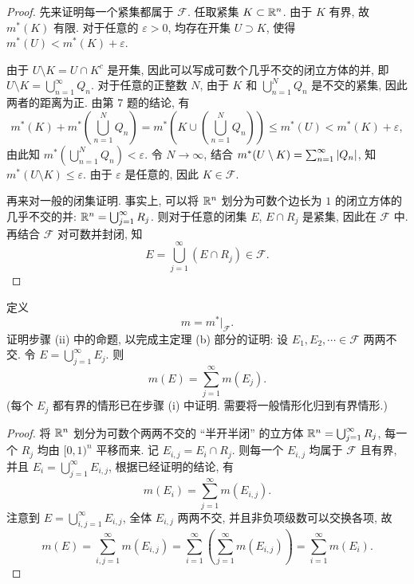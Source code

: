 \documentclass{article}
\begin{document}
\begin{proof}
	先来证明每一个紧集都属于 $\mathcal{F}$. 任取紧集 $K \subset \mathbb{R}^n$. 由于 $K$ 有界, 故 $m^*(K)$ 有限. 对于任意的 $\varepsilon>0$, 均存在开集 $U \supset K$, 使得 $m^*(U) < m^*(K) + \varepsilon$. 

	由于 $U \setminus K = U \cap K^c$ 是开集, 因此可以写成可数个几乎不交的闭立方体的并, 即 $U \setminus K = \bigcup_{n=1}^{\infty} Q_n$. 对于任意的正整数 $N$, 由于 $K$ 和 $\bigcup_{n=1}^{N} Q_n$ 是不交的紧集, 因此两者的距离为正. 由第 7 题的结论, 有
	\[ m^*(K) + m^* \left( \bigcup_{n=1}^{N} Q_n \right) = m^* \left( K \cup \left( \bigcup_{n=1}^{N} Q_n \right) \right) \le m^*(U) < m^*(K) + \varepsilon, \]
	由此知 $m^* \left( \bigcup_{n=1}^{N}Q_n \right) < \varepsilon$. 令 $N \to \infty$, 结合 $m^*(U \setminus K) = \sum_{n=1}^{\infty} \left|Q_n\right|$, 知 $m^*(U \setminus K) \le \varepsilon$. 由于 $\varepsilon$ 是任意的, 因此 $K \in \mathcal{F}$.

	再来对一般的闭集证明. 事实上, 可以将 $\mathbb{R}^n$ 划分为可数个边长为 $1$ 的闭立方体的几乎不交的并: $\mathbb{R}^n = \bigcup_{j = 1}^{\infty}R_j$. 则对于任意的闭集 $E$, $E \cap R_j$ 是紧集, 因此在 $\mathcal{F}$ 中. 再结合 $\mathcal{F}$ 对可数并封闭, 知
	\[ E = \bigcup_{j=1}^{\infty} (E \cap R_j) \in \mathcal{F}. \]
\end{proof}



\begin{problem}
  定义
  \[
    m=m^*|_{\mathcal{F}}.
  \]
  证明步骤 (ii) 中的命题, 以完成主定理 (b) 部分的证明: 设 $E_1,E_2,\cdots\in\mathcal{F}$ 两两不交. 令 $E=\bigcup_{j=1}^\infty E_j$. 则
  \[
    m(E)=\sum_{j=1}^\infty m(E_j).
  \]
  (每个 $E_j$ 都有界的情形已在步骤 (i) 中证明. 需要将一般情形化归到有界情形.)
\end{problem}

\begin{proof}
	将 $\mathbb{R}^n$ 划分为可数个两两不交的 ``半开半闭'' 的立方体 $\mathbb{R}^n = \bigcup_{j=1}^{\infty} R_j$, 每一个 $R_j$ 均由 $[0, 1)^n$ 平移而来. 记 $E_{i, j} = E_i \cap R_j$. 则每一个 $E_{i,j}$ 均属于 $\mathcal{F}$ 且有界, 并且 $E_i = \bigcup_{j=1}^{\infty} E_{i, j}$, 根据已经证明的结论, 有
	\[ m(E_i) = \sum_{j=1}^{\infty} m(E_{i,j}). \] 
	注意到 $E = \bigcup_{i, j=1}^{\infty}E_{i, j}$, 全体 $E_{i,j}$ 两两不交, 并且非负项级数可以交换各项, 故
	\[ m(E) = \sum_{i, j = 1}^{\infty} m(E_{i, j}) = \sum_{i = 1}^{\infty} \left( \sum_{j=1}^{\infty} m(E_{i, j}) \right) = \sum_{i=1}^{\infty} m(E_i). \]
\end{proof}
\end{document}
